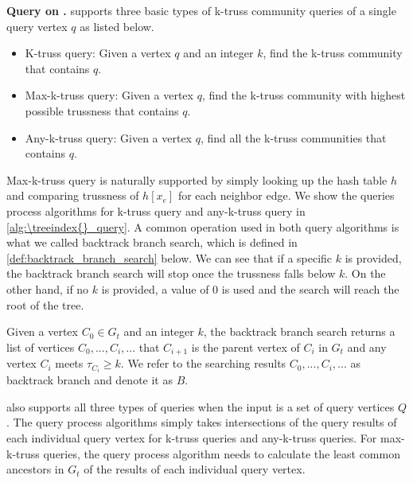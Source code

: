 \vskip 0.1in \noindent \textbf{Query on \TreeIndex{}.}
\Treeindex{} supports three basic types of k-truss community queries of a single query vertex $q$ as listed below.

\begin{itemize}
	\item{K-truss query:} Given a vertex $q$ and an integer $k$, find the k-truss community that contains $q$.
	\item{Max-k-truss query:} Given a vertex $q$, find the k-truss community with highest possible trussness that contains $q$.
	\item{Any-k-truss query:} Given a vertex $q$, find all the k-truss communities that contains $q$.
\end{itemize}

Max-k-truss query is naturally supported by simply looking up the hash table $h$ and comparing trussness of $h[x_e]$ for each neighbor edge. We show the queries process algorithms for k-truss query and any-k-truss query in \autoref{alg:\treeindex{}_query}. A common operation used in both query algorithms is what we called backtrack branch search, which is defined in \autoref{def:backtrack_branch_search} below. We can see that if a specific $k$ is provided, the backtrack branch search will stop once the trussness falls below $k$. On the other hand, if no $k$ is provided, a value of $0$ is used and the search will reach the root of the tree.

\begin{Def}
Given a vertex $C_{0} \in G_t$ and an integer $k$, the backtrack branch search returns a list of vertices $C_{0},...,C_{i},...$ that $C_{i+1}$ is the parent vertex of $C_{i}$ in $G_t$ and any vertex $C_{i}$ meets $\tau_{C_{i}} \ge k$. We refer to the searching results $C_{0},...,C_{i},...$ as backtrack branch and denote it as $B$.
\label{def:backtrack_branch_search}
\end{Def}

\Treeindex{} also supports all three types of queries when the input is a set of query vertices $Q$. The query process algorithms simply takes intersections of the query results of each individual query vertex for k-truss queries and any-k-truss queries. For max-k-truss queries, the query process algorithm needs to calculate the least common ancestors in $G_t$ of the results of each individual query vertex.

